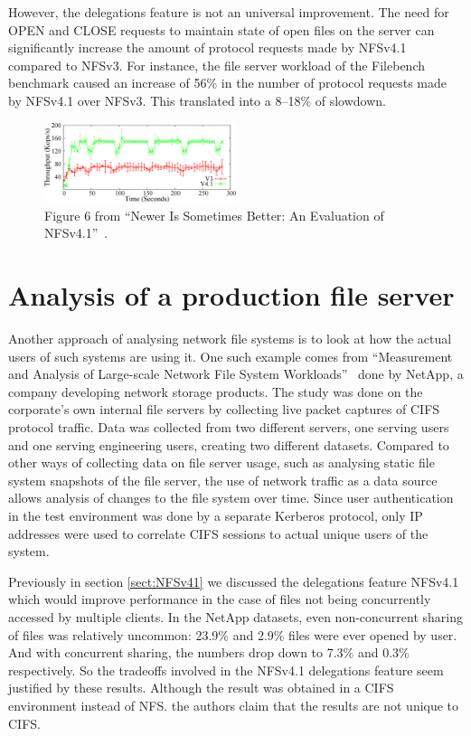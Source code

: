 However, the delegations feature is not an universal improvement.
The need for OPEN and CLOSE requests to maintain state of open files on the server can significantly increase the amount of protocol requests made by NFSv4.1 compared to NFSv3.
For instance, the file server workload of the Filebench benchmark caused an increase of 56\% in the number of protocol requests made by NFSv4.1 over NFSv3.
This translated into a 8--18\% of slowdown.

\begin{figure}[h]
\centering\includegraphics[width=0.5\textwidth]{images/nfsv41better-reading-small-files.png}
\caption{Figure 6 from ``Newer Is Sometimes Better: An Evaluation of NFSv4.1''~\cite{NFSv4Better}.}
\end{figure}

\section{Analysis of a production file server}

Another approach of analysing network file systems is to look at how the actual users of such systems are using it.
One such example comes from ``Measurement and Analysis of Large-scale Network File System Workloads''~\cite{NetApp} done by NetApp,
a company developing network storage products.
The study was done on the corporate's own internal file servers by collecting live packet captures of CIFS protocol traffic.
Data was collected from two different servers, one serving users and one serving engineering users, creating two different datasets.
Compared to other ways of collecting data on file server usage, such as analysing static file system snapshots of the file server,
the use of network traffic as a data source allows analysis of changes to the file system over time.
Since user authentication in the test environment was done by a separate Kerberos protocol,
only IP addresses were used to correlate CIFS sessions to actual unique users of the system.

Previously in section \ref{sect:NFSv41} we discussed the delegations feature NFSv4.1 which would improve performance in the case of files not being concurrently accessed by multiple clients.
In the NetApp datasets, even non-concurrent sharing of files was relatively uncommon: 23.9\% and 2.9\% files were ever opened by user.
And with concurrent sharing, the numbers drop down to 7.3\% and 0.3\% respectively.
So the tradeoffs involved in the NFSv4.1 delegations feature seem justified by these results.
Although the result was obtained in a CIFS environment instead of NFS.
the authors claim that the results are not unique to CIFS.

